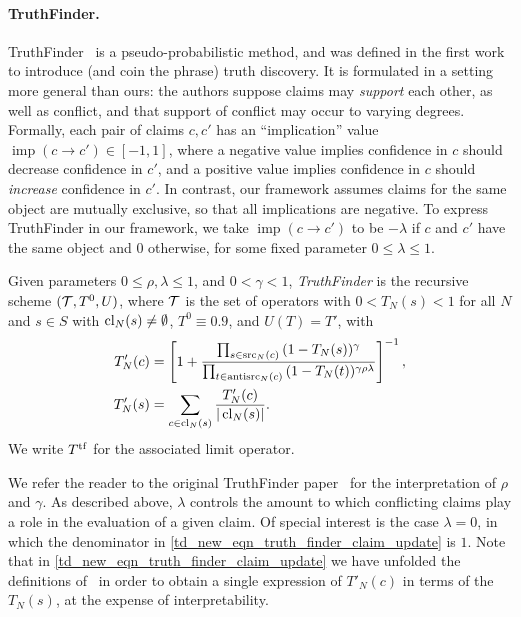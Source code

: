 \paragraph{TruthFinder.} TruthFinder~\cite{yin2008} is a pseudo-probabilistic
method, and was defined in the first work to introduce (and coin the phrase)
truth discovery. It is formulated in a setting more general than ours: the
authors suppose claims may \emph{support} each other, as well as conflict, and
that support of conflict may occur to varying degrees. Formally, each pair of
claims $c, c'$ has an ``implication'' value $\operatorname{imp}(c \to c') \in
[-1, 1]$, where a negative value implies confidence in $c$ should decrease
confidence in $c'$, and a positive value implies confidence in $c$ should
\emph{increase} confidence in $c'$. In contrast, our framework assumes claims
for the same object are mutually exclusive, so that all implications are
negative. To express TruthFinder in our framework, we take
$\operatorname{imp}(c \to c')$ to be $-\lambda$ if $c$ and $c'$ have the same
object and $0$ otherwise, for some fixed parameter $0 \le \lambda \le 1$.

\begin{definition}
    Given parameters $0 \le \rho, \lambda \le 1$, and $0 < \gamma < 1$,
    \emph{TruthFinder} is the recursive scheme $(\mathcal{T}, T^0, U)$, where $\mathcal{T}$ is
    the set of operators with $0 < T_N(s) < 1$ for all $N$ and $s \in S$ with
    $\operatorname{cl}_N(s) \ne \emptyset$, $T^0 \equiv 0.9$, and $U(T) = T'$, with
    \begin{align}
        \label{td_new_eqn_truth_finder_claim_update}
        T'_N(c) &= \left[
            1 +
            \frac{
                \prod_{s \in \operatorname{src}_N(c)}{(1 - T_N(s))^\gamma}
            }{
                \prod_{t \in \operatorname{antisrc}_N(c)}{(1 - T_N(t))^{\gamma\rho\lambda}}
            }
        \right]^{-1}, \\
        T'_N(s) &= \sum_{c \in \operatorname{cl}_N(s)}{
            \frac{T'_N(c)}{|\operatorname{cl}_N(s)|}
        }.
    \end{align}
    We write $T^{\operatorname{tf}}$ for the associated limit operator.
\end{definition}

We refer the reader to the original TruthFinder paper~\cite{yin2008} for the
interpretation of $\rho$ and $\gamma$. As described above, $\lambda$ controls
the amount to which conflicting claims play a role in the evaluation of a given
claim. Of special interest is the case $\lambda = 0$, in which the denominator
in \cref{td_new_eqn_truth_finder_claim_update} is $1$. Note that in
\cref{td_new_eqn_truth_finder_claim_update} we have unfolded the definitions
of~\cite{yin2008} in order to obtain a single expression of $T'_N(c)$ in terms
of the $T_N(s)$, at the expense of interpretability.

